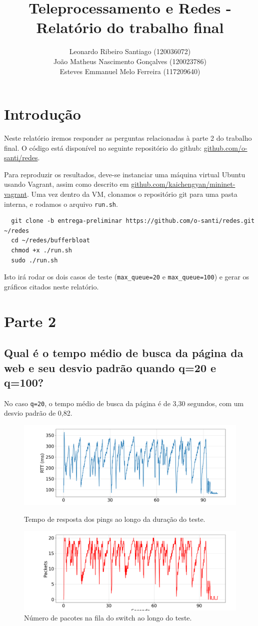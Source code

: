\documentclass[a4paper,12pt]{article}
\title{Teleprocessamento e Redes - Relatório do trabalho final}
\author{
  Leonardo Ribeiro Santiago (120036072) \\
  João Matheus Nascimento Gonçalves (120023786) \\
  Esteves Emmanuel Melo Ferreira (117209640) }
\date{}
\newcommand{\code}[1]{\texttt{#1}}
\begin{document}
\maketitle

\section{Introdução}

Neste relatório iremos responder as perguntas relacionadas à parte 2 do trabalho final. O código está disponível no seguinte repositório do github: {\color{blue} \href{https://github.com/o-santi/redes}{github.com/o-santi/redes}}.

Para reproduzir os resultados, deve-se instanciar uma máquina virtual Ubuntu usando Vagrant, assim como descrito em {\color{blue} \href{https://github.com/kaichengyan/mininet-vagrant}{github.com/kaichengyan/mininet-vagrant}}. Uma vez dentro da VM, clonamos o repositório git para uma pasta interna, e rodamos o arquivo \code{run.sh}.
\begin{verbatim}
  git clone -b entrega-preliminar https://github.com/o-santi/redes.git ~/redes
  cd ~/redes/bufferbloat
  chmod +x ./run.sh
  sudo ./run.sh
\end{verbatim}

Isto irá rodar os dois casos de teste (\code{max\_queue=20} e \code{max\_queue=100}) e gerar os gráficos citados neste relatório.

\section{Parte 2}

\subsection{Qual é o tempo médio de busca da página da web e seu desvio padrão quando q=20 e q=100?}

No caso \code{q=20}, o tempo médio de busca da página é de 3,30 segundos, com um desvio padrão de 0,82.
\begin{figure}[h!]
  \centering
  \includegraphics[width=0.5\columnwidth]{./bufferbloat/bb-q20/reno-rtt-q20.png}
  \caption{Tempo de resposta dos pings ao longo da duração do teste.}
  \includegraphics[width=0.5\columnwidth]{./bufferbloat/bb-q20/reno-buffer-q20.png}
  \caption{Número de pacotes na fila do switch ao longo do teste.}
\end{figure}
\end{document}
